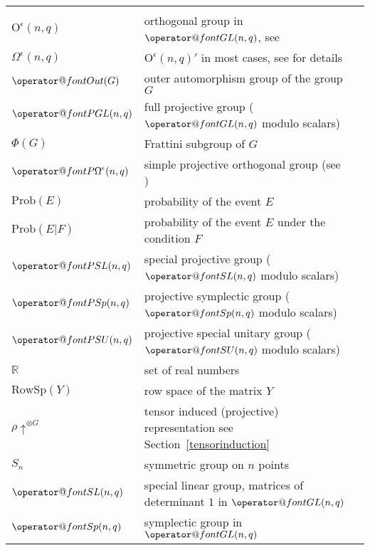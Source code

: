 \documentclass[openany,11pt,british]{book}
\makeatletter
\newcommand{\maop}[1]{%
\ensuremath{\mathop{\operator@font #1}\nolimits}}
\newcommand{\GL}{\maop{GL}}
\newcommand{\PGL}{\maop{PGL}}
\newcommand{\SL}{\maop{SL}}
\newcommand{\PSL}{\maop{PSL}}
\newcommand{\Sp}{\maop{Sp}}
\newcommand{\PSp}{\maop{PSp}}
\newcommand{\SU}{\maop{SU}}
\newcommand{\PSU}{\maop{PSU}}
\newcommand{\POmega}{\maop{P\Omega}}
\newcommand{\Prob}{\mathrm{Prob}}
\newcommand{\rsp}{\mathrm{RowSp}}
\newcommand{\Out}{\maop{Out}}
\newcommand{\R}{\ensuremath{\mathbb{R}}}
\theoremstyle{changebreak}
\makeatother
\begin{document}
\begin{longtable}{|lll|}
                        & \\
$\mathrm{O}^{\epsilon}(n,q)$   & orthogonal group in $\GL(n,q)$, see 
                          \cite[Section 2.4]{ATLAS}
                        & \\
$\Omega^{\epsilon}(n,q)$ & $\mathrm{O}^{\epsilon}(n,q)'$ in
most cases, see \cite[Section 2.4]{ATLAS} for details
                        & \\
$\Out(G)$               & outer automorphism group of the group $G$
                        & \\
$\PGL(n,q)$             & full projective group ($\GL(n,q)$ modulo scalars)
                        & \\
$\Phi(G)$               & Frattini subgroup of $G$ 
                        & \\
$\POmega^{\epsilon}(n,q)$   & simple projective orthogonal group (see
                          \cite[Section 2.4]{ATLAS})
                        & \\
$\Prob(E)$              & probability of the event $E$
                        & \\
$\Prob(E|F)$            & probability of the event $E$ under the condition $F$
                        & \\
$\PSL(n,q)$             & special projective group ($\SL(n,q)$ modulo scalars)
                        & \\
$\PSp(n,q)$             & projective symplectic group ($\Sp(n,q)$ modulo 
                          scalars)
                        & \\
$\PSU(n,q)$             & projective special unitary group ($\SU(n,q)$ modulo scalars)
                        & \\
$\R$                    & set of real numbers
                        & \\
$\rsp(Y)$               & row space of the matrix $Y$
                        & \\
$\rho\!\uparrow^{\otimes G}$ & tensor induced (projective) representation
                          see Section~\ref{tensorinduction}
                        & \\
$S_n$                   & symmetric group on $n$ points
                        & \\
$\SL(n,q)$              & special linear group, matrices of determinant $1$
                          in $\GL(n,q)$
                        & \\
$\Sp(n,q)$              & symplectic group in $\GL(n,q)$

\end{longtable}
\end{document}
